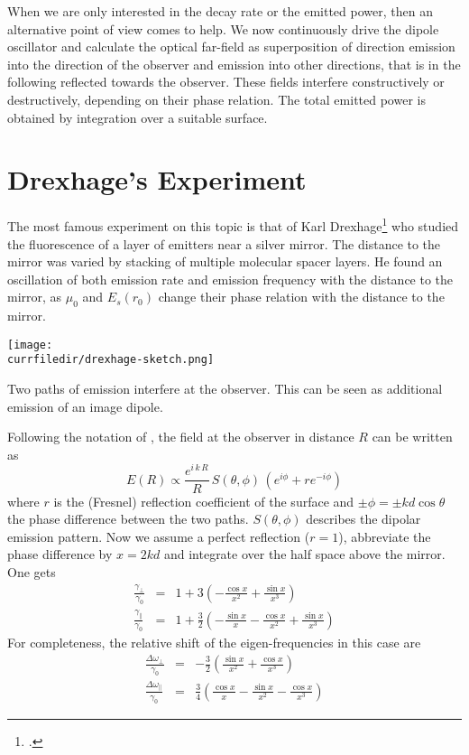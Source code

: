 When we are only interested in the decay rate or the emitted power, then an alternative point of view comes to help. We now continuously drive the dipole oscillator and calculate the optical far-field as superposition of direction emission into the direction of the observer and emission into other directions, that is in the following reflected towards the observer. These fields interfere constructively or destructively, depending on their phase relation. The total emitted power is obtained by integration over a suitable surface.


\section{Drexhage's Experiment}

The most famous experiment on this topic is that of Karl Drexhage\footcite{Drexhage74} who studied the fluorescence of a layer of emitters near a silver mirror. The distance to the mirror was varied by stacking of multiple molecular spacer layers. He found an oscillation of both emission rate and emission frequency with the distance to the mirror, as $\mu_0$ and $E_s(r_0)$ change their phase relation with the distance to the mirror. 

\begin{marginfigure}
\texttt{[image: \\currfiledir/drexhage-sketch.png]}
\caption{Two paths of emission interfere at the observer. This can be seen as additional emission of an image dipole.}
\end{marginfigure}

Following the notation of \cite{Langguth16}, the field at the observer in distance $R$ can be written as
\begin{equation}
E(R) \propto \frac{e^{i \, k \, R}}{R} \, S(\theta, \phi) \, \left( e^{i \phi} + r  e^{- i \phi} \right)
\end{equation}
where $r$ is the (Fresnel) reflection coefficient of the surface and $\pm \phi = \pm k d \cos \theta$ the phase difference between the two paths. $S(\theta, \phi)$ describes the dipolar emission pattern. Now we assume a perfect reflection ($r=1$), abbreviate  the phase difference by $x = 2 k d$ and integrate over the half space above the mirror. One gets
\begin{eqnarray}
 \frac{\gamma_\perp }{\gamma_0} & = & 1 + 3 \left( - \frac{\cos x}{x^2} + \frac{\sin x}{x^3} \right) \\
  \frac{\gamma_\parallel }{\gamma_0} & = & 1 + \frac{3}{2} \left( - \frac{\sin x}{x} - \frac{\cos x}{x^2}  + \frac{\sin x}{x^3} \right) 
\end{eqnarray}
For completeness, the relative shift of the eigen-frequencies in this case are
\begin{eqnarray}
 \frac{\Delta \omega_\perp }{\gamma_0} & = & - \frac{3}{2} \left(  \frac{\sin x}{x^2} + \frac{\cos x}{x^3} \right) \\
  \frac{\Delta \omega_\parallel }{\gamma_0} & = & \frac{3}{4} \left(  \frac{\cos x}{x} - \frac{\sin x}{x^2}  - \frac{\cos x}{x^3} \right) 
\end{eqnarray}





\printbibliography[segment=\therefsegment,heading=subbibliography]
